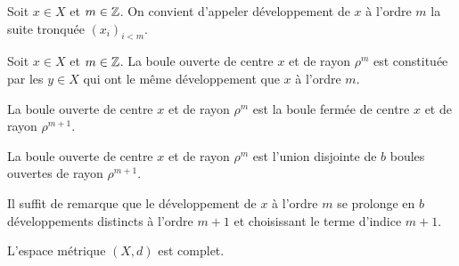 \begin{defi}
 Soit $x\in X$ et $m\in \mathbb{Z}$. On convient d'appeler développement de $x$ à l'ordre $m$ la suite tronquée $(x_i)_{i<m}$.
\end{defi}

\begin{prop}
 Soit $x\in X$ et $m\in \mathbb{Z}$. La boule ouverte de centre $x$ et de rayon $\rho^m$ est constituée par les $y\in X$ qui ont le même développement que $x$ à l'ordre $m$.
\end{prop}
\begin{prop}
 La boule ouverte de centre $x$ et de rayon $\rho^m$ est la boule fermée de centre $x$ et de rayon $\rho^{m+1}$.
\end{prop}
\begin{prop}
 La boule ouverte de centre $x$ et de rayon $\rho^m$ est l'union disjointe de $b$ boules ouvertes de rayon $\rho^{m+1}$.
\end{prop}
\begin{demo}
 Il suffit de remarque que le développement de $x$ à l'ordre $m$ se prolonge en $b$ développements distincts à l'ordre $m+1$ et choisissant le terme d'indice $m+1$.
\end{demo}
\begin{prop}
 L'espace métrique $(X,d)$ est complet.
\end{prop}
